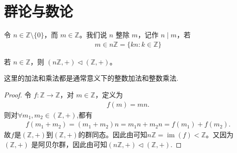 \documentclass[../../main.tex]{subfiles}
\begin{document}
\section{群论与数论}

\begin{definition}[整除]
令 $n\in \mathbb{Z}\setminus\{0\}$，而 $m\in \mathbb{Z}$。我们说 $n$ 整除 $m$，记作 $n\mid m$，若
\begin{align*}
m\in n\mathbb{Z}=\{kn:k\in\mathbb{Z}\}
\end{align*} 
\end{definition}

\begin{proposition}\label{proposition:nZ是Z的正规子群}
若 $n\in\mathbb{Z}$，则 $(n\mathbb{Z},+)\lhd(\mathbb{Z},+)$。
\end{proposition}
\begin{remark}
这里的加法和乘法都是通常意义下的整数加法和整数乘法.
\end{remark}
\begin{proof}
令 $f:\mathbb{Z}\to \mathbb{Z}$，对 $m\in\mathbb{Z}$，定义为
\begin{align*}
f(m)=mn.
\end{align*}
则对$\forall m_1,m_2\in (\mathbb{Z},+)$,都有 
\begin{align*}
f\left( m_1+m_2 \right) =\left( m_1+m_2 \right) n=m_1n+m_2n=f\left( m_1 \right) +f\left( m_2 \right) .
\end{align*}
故$f$是$(\mathbb{Z},+)$到$(\mathbb{Z},+)$的群同态。因此由可知$n\mathbb{Z}=\operatorname{im}(f)<\mathbb{Z}$。又因为 $(\mathbb{Z},+)$ 是阿贝尔群，因此由可知$(n\mathbb{Z},+)\lhd(\mathbb{Z},+)$.
\end{proof}
\end{document}
